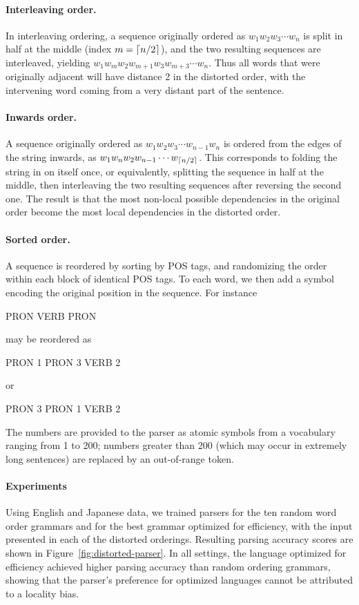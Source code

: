\documentclass[12pt]{article}
\DeclarePairedDelimiter{\ceiling}{\lceil}{\rceil}
\begin{document}
\paragraph{Interleaving order.} In interleaving ordering, a sequence originally ordered as $w_1 w_2 w_3 \cdots w_n$ is split in half at the middle (index $m=\ceiling{n/2}$), and the two resulting sequences are interleaved, yielding $w_1 w_m w_2 w_{m+1} w_3 w_{m+3} \cdots w_n$. Thus all words that were originally adjacent will have distance 2 in the distorted order, with the intervening word coming from a very distant part of the sentence.

\paragraph{Inwards order.} A sequence originally ordered as $w_1 w_2 w_3 \cdots w_{n-1} w_n$ is ordered from the edges of the string inwards, as $w_1 w_n w_2 w_{n-1} \cdots w_{\ceiling{n/2}}$. This corresponds to folding the string in on itself once, or equivalently, splitting the sequence in half at the middle, then interleaving the two resulting sequences after reversing the second one. The result is that the most non-local possible dependencies in the original order become the most local dependencies in the distorted order.

\paragraph{Sorted order.} A sequence is reordered by sorting by POS tags, and randomizing the order within each block of identical POS tags.
To each word, we then add a symbol encoding the original position in the sequence.
For instance
\begin{center}
PRON VERB PRON
\end{center}
may be reordered as
\begin{center}
PRON 1 PRON 3 VERB 2
\end{center}
or
\begin{center}
PRON 3 PRON 1 VERB 2
\end{center}
The numbers are provided to the parser as atomic symbols from a vocabulary ranging from 1 to 200; numbers greater than 200 (which may occur in extremely long sentences) are replaced by an out-of-range token.


\paragraph{Experiments}
Using English and Japanese data, we trained parsers for the ten random word order grammars and for the best grammar optimized for efficiency, with the input presented in each of the distorted orderings.
Resulting parsing accuracy scores are shown in Figure~\ref{fig:distorted-parser}.
In all settings, the language optimized for efficiency achieved higher parsing accuracy than random ordering grammars, showing that the parser's preference for optimized languages cannot be attributed to a locality bias.
\end{document}

